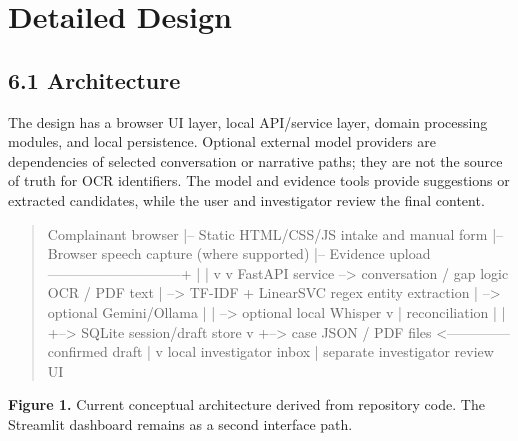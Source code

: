 \documentclass[12pt,a4paper,oneside]{report}
\begin{document}
\clearpage\chapter{Detailed Design}
\section{6.1 Architecture}
The design has a browser UI layer, local API/service layer, domain processing modules, and local persistence. Optional external model providers are dependencies of selected conversation or narrative paths; they are not the source of truth for OCR identifiers. The model and evidence tools provide suggestions or extracted candidates, while the user and investigator review the final content.

\begin{quote}\ttfamily\small
Complainant browser
  |-- Static HTML/CSS/JS intake and manual form
  |-- Browser speech capture (where supported)
  |-- Evidence upload -----------------------------+
  |                                                 |
  v                                                 v
FastAPI service --> conversation / gap logic     OCR / PDF text
  |               --> TF-IDF + LinearSVC         regex entity extraction
  |               --> optional Gemini/Ollama       |
  |               --> optional local Whisper       v
  |                                            reconciliation
  |                                                 |
  +--> SQLite session/draft store                  v
  +--> case JSON / PDF files <-------------- confirmed draft
                        |
                        v
                 local investigator inbox
                        |
            separate investigator review UI
\end{quote}
\textbf{Figure 1.} Current conceptual architecture derived from repository code. The Streamlit dashboard remains as a second interface path.
\end{document}
